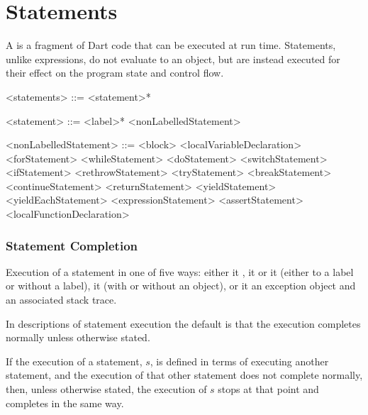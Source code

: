 \documentclass[makeidx]{article}
\begin{document}
{\section{Statements}

\LMHash{}%
A  is a fragment of Dart code that can be executed at run time.
Statements, unlike expressions, do not evaluate to an object,
but are instead executed for their effect on the program state and control flow.

\begin{grammar}
<statements> ::= <statement>*

<statement> ::= <label>* <nonLabelledStatement>

<nonLabelledStatement> ::= <block>
  \alt <localVariableDeclaration>
  \alt <forStatement>
  \alt <whileStatement>
  \alt <doStatement>
  \alt <switchStatement>
  \alt <ifStatement>
  \alt <rethrowStatement>
  \alt <tryStatement>
  \alt <breakStatement>
  \alt <continueStatement>
  \alt <returnStatement>
  \alt <yieldStatement>
  \alt <yieldEachStatement>
  \alt <expressionStatement>
  \alt <assertStatement>
  \alt <localFunctionDeclaration>
\end{grammar}


\subsubsection{Statement Completion}

\LMHash{}%
Execution of a statement 
in one of five ways:
either it
,
it 
or it 
(either to a label or without a label),
it  (with or without an object),
or it 
an exception object and an associated stack trace.

\LMHash{}%
In descriptions of statement execution the default is that
the execution completes normally unless otherwise stated.

\LMHash{}%
If the execution of a statement, $s$,
is defined in terms of executing another statement,
and the execution of that other statement does not complete normally,
then, unless otherwise stated, the execution of $s$ stops
at that point and completes in the same way.

}
\end{document}
